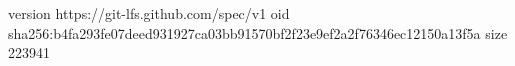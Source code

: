 version https://git-lfs.github.com/spec/v1
oid sha256:b4fa293fe07deed931927ca03bb91570bf2f23e9ef2a2f76346ec12150a13f5a
size 223941
